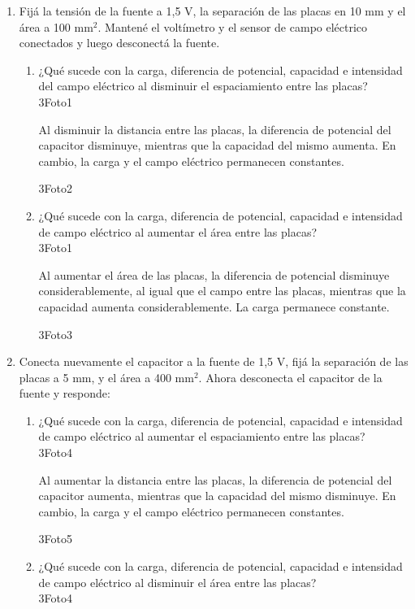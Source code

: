 \documentclass[12pt]{report}
\begin{document}
\begin{enumerate}
    \item Fijá la tensión de la fuente a 1,5 V, la separación de las placas en 10 mm y el área a 100 mm$^2$. Mantené el voltímetro y el sensor de campo eléctrico conectados y luego desconectá la fuente.
    \begin{enumerate}
        \item ¿Qué sucede con la carga, diferencia de potencial, capacidad e intensidad del campo eléctrico al disminuir el espaciamiento entre las placas?
        \\
        3Foto1
        
        Al disminuir la distancia entre las placas, la diferencia de potencial del capacitor disminuye, mientras que la capacidad del mismo aumenta. En cambio, la carga  y el campo eléctrico permanecen constantes.
        
        3Foto2
        \\
        \item ¿Qué sucede con la carga, diferencia de potencial, capacidad e intensidad de campo eléctrico al aumentar el área entre las placas?
        \\
        3Foto1

        Al aumentar el área de las placas, la diferencia de potencial disminuye considerablemente, al igual que el campo entre las placas, mientras que la capacidad aumenta considerablemente. La carga permanece constante.

        3Foto3
        \\
    \end{enumerate}
    \item Conecta nuevamente el capacitor a la fuente de 1,5 V, fijá la separación de las placas a 5 mm, y el área a 400 mm$^2$. Ahora desconecta el capacitor de la fuente y responde:
    \begin{enumerate}
        \item ¿Qué sucede con la carga, diferencia de potencial, capacidad e intensidad de campo eléctrico al aumentar el espaciamiento entre las placas?
        \\
        3Foto4

        Al aumentar la distancia entre las placas, la diferencia de potencial del capacitor aumenta, mientras que la capacidad del mismo disminuye. En cambio, la carga  y el campo eléctrico permanecen constantes.

        3Foto5
        \\
        \item ¿Qué sucede con la carga, diferencia de potencial, capacidad e intensidad de campo eléctrico al disminuir el área entre las placas?
        \\
        3Foto4


\end{enumerate}
\end{enumerate}
\end{document}

